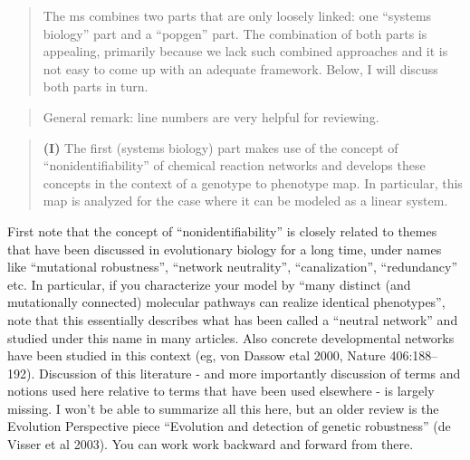 



\begin{quote}
The ms combines two parts that are only loosely linked: one ``systems biology''
part and a ``popgen'' part. The combination of both parts is appealing, primarily
because we lack such combined approaches and it is not easy to come up with an
adequate framework. Below, I will discuss both parts in turn.
\end{quote}

\begin{quote}
General remark: line numbers are very helpful for reviewing.  
\end{quote}

\begin{quote}
    \textbf{(I)} The first (systems biology) part makes use of the concept of
``nonidentifiability'' of chemical reaction networks and develops these concepts
in the context of a genotype to phenotype map. In particular, this map is
analyzed for the case where it can be modeled as a linear system.
\end{quote}

\begin{point}{}
    First note that the concept of ``nonidentifiability'' is closely related to
themes that have been discussed in evolutionary biology for a long time, under
names like ``mutational robustness'', ``network neutrality'', ``canalization'',
``redundancy'' etc. In particular, if you characterize your model by ``many
distinct (and mutationally connected) molecular pathways can realize identical
phenotypes'', note that this essentially describes what has been called a
``neutral network'' and studied under this name in many articles. Also concrete
developmental networks have been studied in this context (eg, von Dassow etal
2000, Nature 406:188–192). Discussion of this literature - and more importantly
discussion of terms and notions used here relative to terms that have been used
elsewhere - is largely missing. I won't be able to summarize all this here, but
an older review is the Evolution Perspective piece ``Evolution and detection of
genetic robustness'' (de Visser et al 2003). You can work work backward and
forward from there.  
\end{point}


